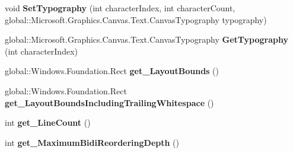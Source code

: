 \begin{DoxyCompactItemize}
\item 
\mbox{\label{interface_microsoft_1_1_graphics_1_1_canvas_1_1_text_1_1_i_canvas_text_layout_a882229f7daee747656cede530df97f13}} 
void {\bfseries Set\+Typography} (int character\+Index, int character\+Count, global\+::\+Microsoft.\+Graphics.\+Canvas.\+Text.\+Canvas\+Typography typography)
\item 
\mbox{\label{interface_microsoft_1_1_graphics_1_1_canvas_1_1_text_1_1_i_canvas_text_layout_a75787883a628465c1be818d21a9828f6}} 
global\+::\+Microsoft.\+Graphics.\+Canvas.\+Text.\+Canvas\+Typography {\bfseries Get\+Typography} (int character\+Index)
\item 
\mbox{\label{interface_microsoft_1_1_graphics_1_1_canvas_1_1_text_1_1_i_canvas_text_layout_af55ce4a21c46a7f5089b4dbbbd66f336}} 
global\+::\+Windows.\+Foundation.\+Rect {\bfseries get\+\_\+\+Layout\+Bounds} ()
\item 
\mbox{\label{interface_microsoft_1_1_graphics_1_1_canvas_1_1_text_1_1_i_canvas_text_layout_a890cd156f823cdf4a32285b115407daf}} 
global\+::\+Windows.\+Foundation.\+Rect {\bfseries get\+\_\+\+Layout\+Bounds\+Including\+Trailing\+Whitespace} ()
\item 
\mbox{\label{interface_microsoft_1_1_graphics_1_1_canvas_1_1_text_1_1_i_canvas_text_layout_abdd79458426259c3a675c4bce6023422}} 
int {\bfseries get\+\_\+\+Line\+Count} ()
\item 
\mbox{\label{interface_microsoft_1_1_graphics_1_1_canvas_1_1_text_1_1_i_canvas_text_layout_a6a8cb40ddc63b383f347253a749d9f8f}} 
int {\bfseries get\+\_\+\+Maximum\+Bidi\+Reordering\+Depth} ()
\item 
\mbox{\label{interface_microsoft_1_1_graphics_1_1_canvas_1_1_text_1_1_i_canvas_text_layout_a4025e4ade30314f817baa66bd51ff1a2}} 

\end{DoxyCompactItemize}
